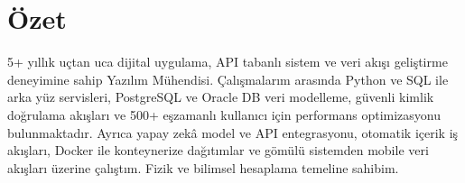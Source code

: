 \section{Özet}

5+ yıllık uçtan uca dijital uygulama, API tabanlı sistem ve veri akışı geliştirme deneyimine sahip Yazılım Mühendisi. Çalışmalarım arasında Python ve SQL ile arka yüz servisleri, PostgreSQL ve Oracle DB veri modelleme, güvenli kimlik doğrulama akışları ve 500+ eşzamanlı kullanıcı için performans optimizasyonu bulunmaktadır. Ayrıca yapay zekâ model ve API entegrasyonu, otomatik içerik iş akışları, Docker ile konteynerize dağıtımlar ve gömülü sistemden mobile veri akışları üzerine çalıştım. Fizik ve bilimsel hesaplama temeline sahibim.
